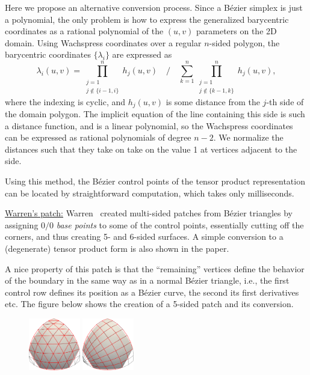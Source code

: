 \documentclass{article}
\begin{document}
Here we propose an alternative conversion process. Since a B\'ezier simplex is just a polynomial,
the only problem is how to express the generalized barycentric coordinates as a rational polynomial
of the $(u,v)$ parameters on the 2D domain. Using Wachspress coordinates over a regular $n$-sided
polygon, the barycentric coordinates $\{\lambda_i\}$ are expressed as
\begin{equation}
  \label{eq:wachspress}
  \lambda_i(u,v) = \prod_{\substack{j=1\\j\notin\{i-1,i\}}}^nh_j(u,v) \quad\bigg/\quad
                   \sum_{k=1}^n\prod_{\substack{j=1\\j\notin\{k-1,k\}}}^nh_j(u,v),
\end{equation}
where the indexing is cyclic, and $h_j(u,v)$ is some distance
from the $j$-th side of the domain polygon. The implicit
equation of the line containing this side is such a distance function, and is a linear polynomial,
so the Wachspress coordinates can be expressed as rational polynomials of degree $n-2$. We
normalize the distances such that they take on take on the value 1 at vertices adjacent to the side.

Using this method, the B\'ezier control points of the tensor product representation
can be located by straightforward computation, which takes only milliseconds.

\vspace{10pt}
\noindent\underline{Warren's patch:}\vspace{0.2em}\newline
Warren~\cite{warren} created multi-sided patches from B\'ezier triangles by assigning $0/0$
\emph{base points} to some of the control points, essentially cutting off the corners, and thus
creating 5- and 6-sided surfaces. A simple conversion to a (degenerate) tensor product form is
also shown in the paper.

A nice property of this patch is that the ``remaining'' vertices define the behavior of the
boundary in the same way as in a normal B\'ezier triangle, i.e., the first control row defines
its position as a B\'ezier curve, the second its first derivatives etc.
The figure below shows the creation of a 5-sided patch and its conversion.
\begin{figure}[h!]
  \centering
  \includegraphics[width = 0.20\textwidth]{images/warren-cnet.png}
  \hspace{3cm}
  \includegraphics[width = 0.20\textwidth]{images/warren-quad.png}
\end{figure}
\end{document}
